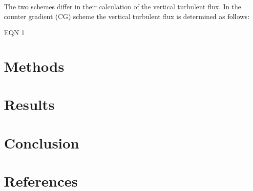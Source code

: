 \documentclass[12pt]{article}
\begin{document}
The two schemes differ in their calculation of the vertical turbulent flux. In the counter 
gradient (CG) scheme the vertical turbulent flux is determined as follows:

EQN 1





\section{Methods}

\section{Results}

\section{Conclusion}

\pagebreak
\section{References}
\end{document}
